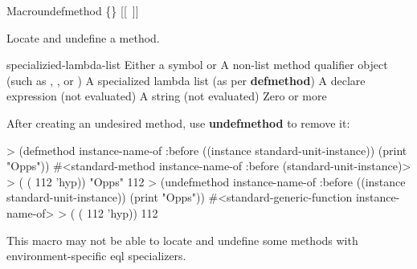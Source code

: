 \documentclass[10pt,twoside,english,pdftex]{article}
\begin{document}
\begin{functiondoc}{Macro}{undefmethod}{
    \{\}\superstar{}  
    \mbox{[[\superstar{} \vbar{} ]]}
    \superstar}
%
%
%
  
\fnsyntax

\fnpurpose Locate and undefine a method.

\fnpackage {}

\fnmodule {}

\fnargs
\begin{args}{specializied-lambda-list}
 Either a symbol or 
 A non-list method qualifier object (such as
, , or )
 A specialized lambda list (as per
\textbf{defmethod}) 
\arg[declarations] A declare expression (not evaluated)
\arg[documentation] A string (not evaluated)
\arg[forms] Zero or more 
\end{args}

\fnexample
{}%
%
After creating an undesired method, use \textbf{undefmethod} to remove it:
\begin{example}
> (defmethod instance-name-of :before ((instance standard-unit-instance))
     (print "Opps"))
#<standard-method instance-name-of :before (standard-unit-instance)>
> ( ( 112 'hyp))
"Opps" 
112
> (undefmethod instance-name-of :before ((instance standard-unit-instance))
     (print "Opps"))
#<standard-generic-function instance-name-of>
> ( ( 112 'hyp))
112
\end{example}

\fnnote This macro may not be able to locate and undefine some methods with
environment-specific eql specializers.

\end{functiondoc}

\end{document}
